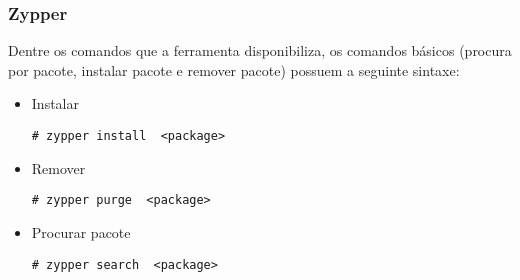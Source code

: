 \subsubsection{Zypper} %
\label{sub:zypper}

Dentre os comandos que a ferramenta disponibiliza, os comandos básicos (procura por pacote, instalar pacote e remover pacote) possuem a seguinte sintaxe:

\begin{itemize}
	\item Instalar
	\begin{lstlisting}[numbers=none,commentstyle=\color{black}]
	# zypper install  <package>
	\end{lstlisting}
	\item Remover
	\begin{lstlisting}[numbers=none,commentstyle=\color{black}]
	# zypper purge  <package>
	\end{lstlisting}
	\item Procurar pacote
	\begin{lstlisting}[numbers=none,commentstyle=\color{black}]
	# zypper search  <package>
	\end{lstlisting}
\end{itemize}
